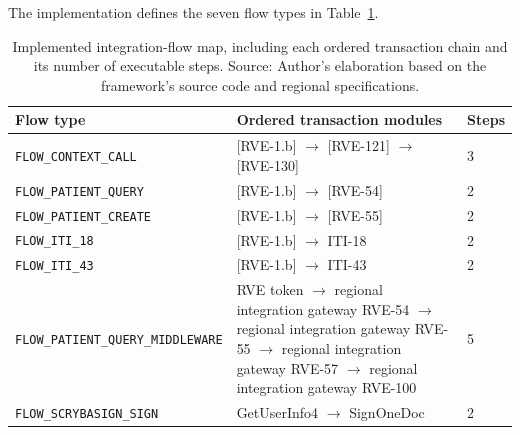 \noindent The implementation defines the seven flow types in
Table~\ref{tab:implemented-flow-types}.

\begin{table}[H]
    \centering
    \caption[Implemented integration-flow map]{Implemented integration-flow map, including each ordered transaction chain and its number of executable steps. Source: Author's elaboration based on the framework's source code and regional specifications.}
    \scriptsize
    \begin{tabular}{|p{3.2cm}|p{7.8cm}|p{1.0cm}|}
        \hline
        \rowcolor{veryPeri!18}
        \textbf{Flow type} & \textbf{Ordered transaction modules} & \textbf{Steps} \\
        \hline
        \rowcolor{tableGray}
        \texttt{FLOW\_CONTEXT\_CALL} & [RVE-1.b] $\rightarrow$ [RVE-121] $\rightarrow$ [RVE-130] & 3 \\
        \hline
        \texttt{FLOW\_PATIENT\_QUERY} & [RVE-1.b] $\rightarrow$ [RVE-54] & 2 \\
        \hline
        \rowcolor{tableGray}
        \texttt{FLOW\_PATIENT\_CREATE} & [RVE-1.b] $\rightarrow$ [RVE-55] & 2 \\
        \hline
        \texttt{FLOW\_ITI\_18} & [RVE-1.b] $\rightarrow$ ITI-18 & 2 \\
        \hline
        \rowcolor{tableGray}
        \texttt{FLOW\_ITI\_43} & [RVE-1.b] $\rightarrow$ ITI-43 & 2 \\
        \hline
        \texttt{FLOW\_PATIENT\_QUERY\_}\allowbreak\texttt{MIDDLEWARE} & RVE token $\rightarrow$ regional integration gateway RVE-54 $\rightarrow$ regional integration gateway RVE-55 $\rightarrow$ regional integration gateway RVE-57 $\rightarrow$ regional integration gateway RVE-100 & 5 \\
        \hline
        \rowcolor{tableGray}
        \texttt{FLOW\_SCRYBASIGN\_}\allowbreak\texttt{SIGN} & GetUserInfo4 $\rightarrow$ SignOneDoc & 2 \\
        \hline
    \end{tabular}
    \label{tab:implemented-flow-types}
\end{table}

